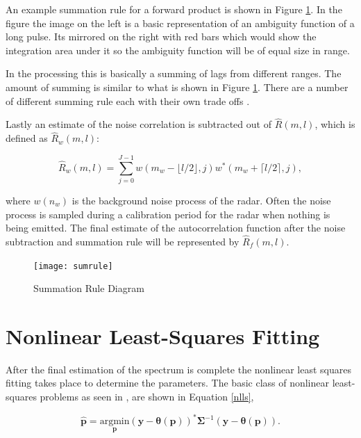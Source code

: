 \documentclass[10pt]{report}
\begin{document}
An example summation rule for a forward product is shown in Figure \ref{fig:sumrule}. In the figure the image on the left is a basic representation of an ambiguity function of a long pulse.  Its mirrored on the right with red bars which would show the integration area under it so the ambiguity function will be of equal size in range.  

In the processing this is basically a summing of lags from different ranges.  The amount of summing is similar to what is shown in Figure \ref{fig:sumrule}.  There are a number of different summing rule each with their own trade offs \cite{nygren1996}.  

Lastly an estimate of the noise correlation is subtracted out of $\hat{R}(m,l)$, which is defined as $\hat{R}_w(m,l)$:

\begin{equation}
\label{lagpro}
\hat{R}_w(m,l) = \displaystyle\sum\limits_{j=0}^{J-1} w(m_w-\lfloor l/2\rfloor,j)w^*(m_w+\lceil l/2 \rceil,j),
\end{equation}

\noindent where $w(n_w)$ is the background noise process of the radar.  Often the noise process is sampled during a calibration period for the radar when nothing is being emitted.  The final estimate of the autocorrelation function after the noise subtraction and summation rule will be represented by $\hat{R}_f(m,l)$.
\begin{figure}[!t]
\centering
\texttt{[image: sumrule]}
\caption{Summation Rule Diagram}
\label{fig:sumrule}
\end{figure}

\section{Nonlinear Least-Squares Fitting}
After the final estimation of the spectrum is complete the nonlinear least squares fitting takes place to determine the parameters.  The basic class of nonlinear least-squares problems as seen in \cite{kayvol1}, are shown in Equation \ref{nlls},

\begin{equation}
	\hat{\mathbf{p}}= \underset{\mathbf{p}}{\text{argmin}} (\mathbf{y}-\bm{\theta}(\mathbf{p}))^*\bm{\Sigma}^{-1}(\mathbf{y}-\bm{\theta}(\mathbf{p})).
\label{nlls}
\end{equation}
\end{document}
